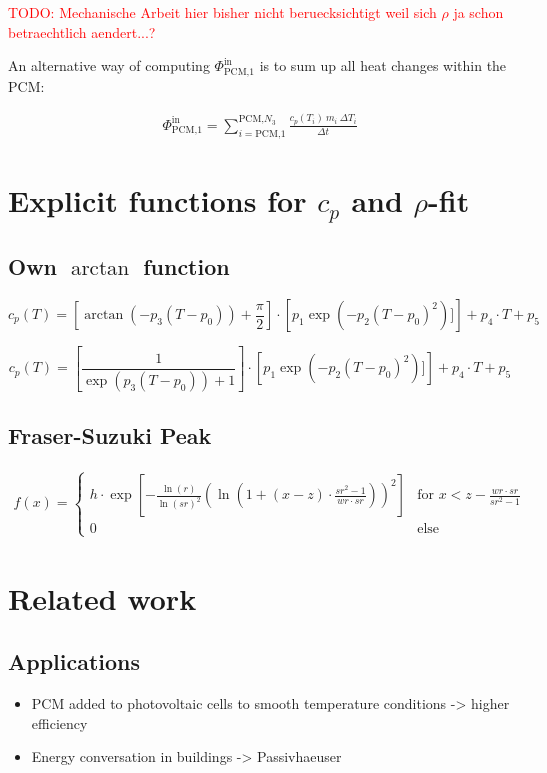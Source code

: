 \documentclass{scrartcl}[12pt, halfparskip]
\newcommand{\todo}[1]{\textcolor{red}{TODO: #1}}
\begin{document}
\todo{Mechanische Arbeit hier bisher nicht beruecksichtigt weil sich $\rho$ ja schon betraechtlich aendert...?}

An alternative way of computing $\Phi_{\text{PCM,}1}^{\text{in}}$ is to sum up all heat changes within the PCM:

\begin{align*}
	\Phi_{\text{PCM,1}}^{\text{in}} = \sum\limits_{i=\text{PCM,1}}^{\text{PCM,}N_3} \frac{c_p(T_i) \ m_i \ \Delta T_i}{\Delta t}
\end{align*}


\section{Explicit functions for $c_p$ and $\rho$-fit}
\subsection{Own $\arctan$ function}

\begin{equation*}
	c_p(T) = \left[ \arctan (-p_3 (T-p_0)) + \frac{\pi}{2} \right] \cdot \left[ p_1 \exp(-p_2(T-p_0)^2)] \right] + p_4 \cdot T + p_5 
\end{equation*}


\begin{equation*}
	c_p(T) = \left[ \frac{1}{\exp(p_3(T-p_0)) + 1} \right] \cdot \left[ p_1 \exp(-p_2(T-p_0)^2)] \right] + p_4 \cdot T + p_5 
\end{equation*}

\subsection{Fraser-Suzuki Peak}

\begin{align}
	f(x) = \left\{ \begin{array}{lr}
	 h \cdot \exp\left[ -\frac{\ln(r)}{\ln(sr)^2} \left( \ln(1+(x-z) \cdot \frac{sr^2 - 1}{wr \cdot sr}) \right)^2 \right] & \text{for } x < z - \frac{wr \cdot sr}{sr^2 - 1} \\
	 0 & \text{else}
	\end{array} \right.
\end{align}



\section{Related work}
\subsection{Applications}
\begin{itemize}
	\item PCM added to photovoltaic cells to smooth temperature conditions -> higher efficiency \cite{pv-pcm}
	\item Energy conversation in buildings -> Passivhaeuser 
\end{itemize}
\end{document}
